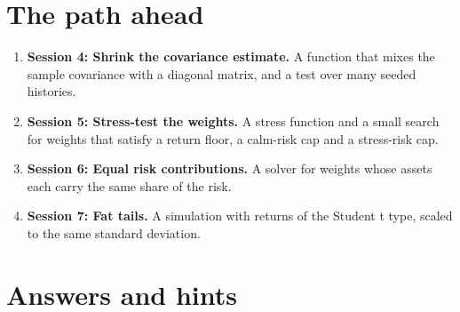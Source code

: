 \documentclass[11pt,a4paper]{article}
\begin{document}
\section{The path ahead}
\begin{enumerate}[nosep]
\item \textbf{Session 4: Shrink the covariance estimate.} A function that mixes the sample covariance with a diagonal matrix, and a test over many seeded histories.
\item \textbf{Session 5: Stress-test the weights.} A stress function and a small search for weights that satisfy a return floor, a calm-risk cap and a stress-risk cap.
\item \textbf{Session 6: Equal risk contributions.} A solver for weights whose assets each carry the same share of the risk.
\item \textbf{Session 7: Fat tails.} A simulation with returns of the Student t type, scaled to the same standard deviation.
\end{enumerate}

\section{Answers and hints}
\end{document}
